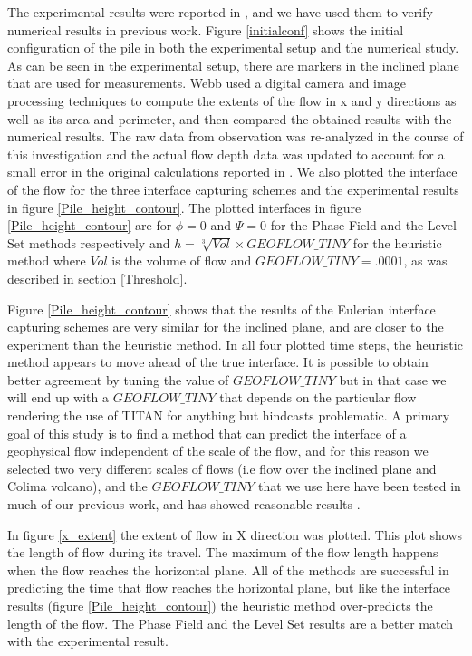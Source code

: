 \documentclass[review]{elsarticle}
\begin{document}
The experimental results were reported in \cite{AmyWebb2004}, and we have used them to verify   numerical results  in previous work. 
Figure \ref{initialconf} shows the initial configuration of the pile in both the experimental setup and the numerical study. As can be seen in the experimental setup, 
there are markers in the inclined plane that are used for measurements. Webb \cite{AmyWebb2004}
  used a digital camera and image processing techniques to compute the extents of the flow in 
x and y directions as well as its area and perimeter, and then compared the obtained results with the numerical results.%
The raw data from observation was re-analyzed in the course of this investigation and the actual flow depth data was updated to account for a small error in the original calculations
reported in \cite{AmyWebb2004}.
We also plotted 
the interface of the flow for the three interface capturing schemes and the experimental results in figure \ref{Pile_height_contour}.
The plotted interfaces in figure \ref{Pile_height_contour} are for $\phi=0$ and $\varPsi=0$ for the Phase Field and the Level Set methods respectively 
and $h=\sqrt[3]{Vol} \times GEOFLOW\_TINY $ for the heuristic method where $Vol$ is the volume of flow and $GEOFLOW\_TINY= .0001$, as was described in section \ref{Threshold}.

Figure \ref{Pile_height_contour} shows that the results of the Eulerian interface capturing schemes are very similar for the inclined plane, 
and are closer to the experiment than the heuristic method. In all four plotted time steps, the heuristic method appears to move ahead of the true  interface. 
It is possible to obtain better agreement by tuning the value of  $GEOFLOW\_TINY $  but in that case we will end up with a  $GEOFLOW\_TINY $ that
 depends on the particular flow rendering the use of TITAN for anything but hindcasts problematic. 
A primary goal of  this study is to find a method that can predict the interface of a geophysical flow independent of the scale of the flow, 
and for this reason we selected two very different scales of flows (i.e flow over the inclined plane and Colima volcano), 
and the $GEOFLOW\_TINY $ that we use here have been tested in much of our previous work, and has showed reasonable results \cite{Patra2005,Patra2006}. 

In figure \ref{x_extent} the extent of flow in X direction was plotted. This plot shows the length of flow during its travel. 
The maximum of the flow length happens when the flow reaches the horizontal plane. All of the methods are successful in predicting the time 
that flow reaches the horizontal plane, but like the interface results (figure \ref{Pile_height_contour}) the heuristic method over-predicts the length of the flow.
The Phase Field and the Level Set results are a better match with the experimental result.
\end{document}
